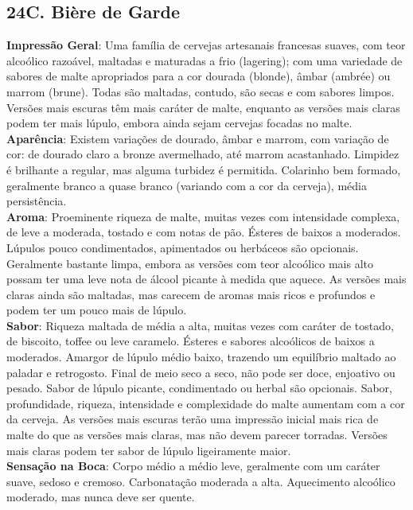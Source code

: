 \subsection*{24C. Bière de Garde}
\textbf{Impressão Geral}: Uma família de cervejas artesanais francesas suaves, com teor alcoólico razoável, maltadas e maturadas a frio (lagering); com uma variedade de sabores de malte apropriados para a cor dourada (blonde), âmbar (ambrée) ou marrom (brune). Todas são maltadas, contudo, são secas e com sabores limpos. Versões mais escuras têm mais caráter de malte, enquanto as versões mais claras podem ter mais lúpulo, embora ainda sejam cervejas focadas no malte. \\
\textbf{Aparência}: Existem variações de dourado, âmbar e marrom, com variação de cor: de dourado claro a bronze avermelhado, até marrom acastanhado. Limpidez é brilhante a regular, mas alguma turbidez é permitida. Colarinho bem formado, geralmente branco a quase branco (variando com a cor da cerveja), média persistência. \\
\textbf{Aroma}: Proeminente riqueza de malte, muitas vezes com intensidade complexa, de leve a moderada, tostado e com notas de pão. Ésteres de baixos a moderados. Lúpulos pouco condimentados, apimentados ou herbáceos são opcionais. Geralmente bastante limpa, embora as versões com teor alcoólico mais alto possam ter uma leve nota de álcool picante à medida que aquece. As versões mais claras ainda são maltadas, mas carecem de aromas mais ricos e profundos e podem ter um pouco mais de lúpulo. \\
\textbf{Sabor}: Riqueza maltada de média a alta, muitas vezes com caráter de tostado, de biscoito, toffee ou leve caramelo. Ésteres e sabores alcoólicos de baixos a moderados. Amargor de lúpulo médio baixo, trazendo um equilíbrio maltado ao paladar e retrogosto. Final de meio seco a seco, não pode ser doce, enjoativo ou pesado. Sabor de lúpulo picante, condimentado ou herbal são opcionais. Sabor, profundidade, riqueza, intensidade e complexidade do malte aumentam com a cor da cerveja. As versões mais escuras terão uma impressão inicial mais rica de malte do que as versões mais claras, mas não devem parecer torradas. Versões mais claras podem ter sabor de lúpulo ligeiramente maior. \\
\textbf{Sensação na Boca}: Corpo médio a médio leve, geralmente com um caráter suave, sedoso e cremoso. Carbonatação moderada a alta. Aquecimento alcoólico moderado, mas nunca deve ser quente. \\
